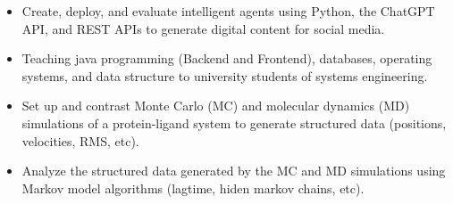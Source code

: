 \documentclass[10pt,letter,ragged2e,withhyper]{altacv}
\begin{document}
\begin{paracol}{2}

\begin{itemize}
\item Create, deploy, and evaluate intelligent agents using Python, the ChatGPT API, and REST APIs to generate digital content for social media.
\end{itemize}

\divider

\begin{itemize}
\item Teaching java programming (Backend and Frontend), databases, operating systems, and data structure to university students of systems engineering.
\end{itemize}

\divider






\begin{itemize}
\item Set up and contrast Monte Carlo (MC) and molecular dynamics (MD) simulations of a protein-ligand system to generate structured data (positions, velocities, RMS, etc).
\item Analyze the structured data generated by the MC and MD simulations using Markov model algorithms (lagtime, hiden markov chains, etc). %
\end{itemize}


\end{paracol}
\end{document}
